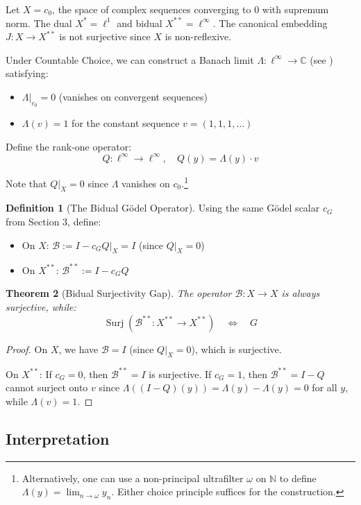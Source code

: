 \documentclass[11pt]{article}
\newtheorem{theorem}{Theorem}[section]
\theoremstyle{definition}
\newtheorem{definition}[theorem]{Definition}
\newcommand{\N}{\mathbb{N}}
\newcommand{\C}{\mathbb{C}}
\DeclareMathOperator{\Surj}{Surj}
\begin{document}
Let $X = c_0$, the space of complex sequences converging to 0 with supremum norm. The dual $X^* = \ell^1$ and bidual $X^{**} = \ell^\infty$. The canonical embedding $J: X \to X^{**}$ is not surjective since $X$ is non-reflexive.

Under Countable Choice, we can construct a Banach limit $\Lambda: \ell^\infty \to \C$ (see \cite[Ch.\,V]{Kato}) satisfying:
\begin{itemize}
\item $\Lambda|_{c_0} = 0$ (vanishes on convergent sequences)
\item $\Lambda(v) = 1$ for the constant sequence $v = (1,1,1,\ldots)$
\end{itemize}

Define the rank-one operator:
\[
Q: \ell^\infty \to \ell^\infty, \quad Q(y) = \Lambda(y) \cdot v
\]

Note that $Q|_X = 0$ since $\Lambda$ vanishes on $c_0$.\footnote{Alternatively, one can use a non-principal ultrafilter $\omega$ on $\N$ to define $\Lambda(y) = \lim_{n\to\omega} y_n$. Either choice principle suffices for the construction.}

\begin{definition}[The Bidual Gödel Operator]
Using the same Gödel scalar $c_G$ from Section 3, define:
\begin{itemize}
\item On $X$: $\mathcal{B} := I - c_G Q|_X = I$ (since $Q|_X = 0$)
\item On $X^{**}$: $\mathcal{B}^{**} := I - c_G Q$
\end{itemize}
\end{definition}

\begin{theorem}[Bidual Surjectivity Gap]\label{thm:bidual}
The operator $\mathcal{B}: X \to X$ is always surjective, while:
\[
\Surj(\mathcal{B}^{**}: X^{**} \to X^{**}) \quad\Longleftrightarrow\quad G
\]
\end{theorem}

\begin{proof}
On $X$, we have $\mathcal{B} = I$ (since $Q|_X = 0$), which is surjective. 

On $X^{**}$: If $c_G = 0$, then $\mathcal{B}^{**} = I$ is surjective. If $c_G = 1$, then $\mathcal{B}^{**} = I - Q$ cannot surject onto $v$ since $\Lambda((I-Q)(y)) = \Lambda(y) - \Lambda(y) = 0$ for all $y$, while $\Lambda(v) = 1$.
\end{proof}

\subsection{Interpretation}
\end{document}
